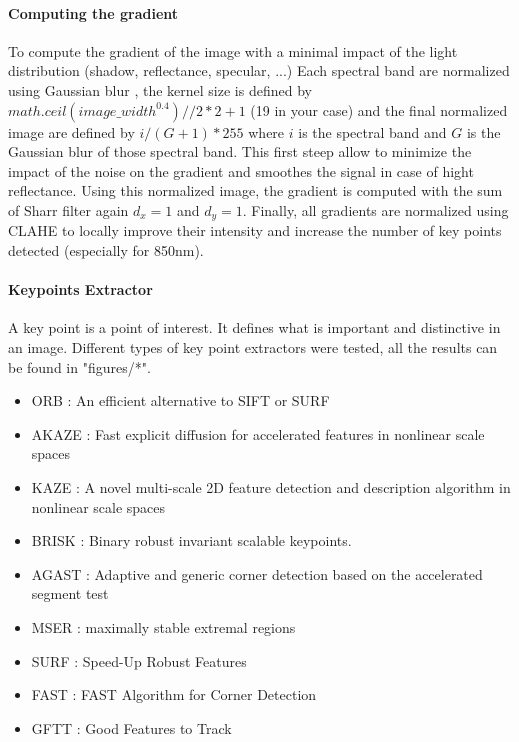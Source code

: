 \documentclass[]{elsarticle}
\begin{document}
	\paragraph{Computing the gradient} To compute the gradient of the image with a minimal impact of the light distribution (shadow, reflectance, specular, ...)
	Each spectral band are normalized using Gaussian blur \cite{sage0303}, the kernel size is defined by $math.ceil(image\_width^{0.4}) // 2 * 2 +1$ (19 in your case)
	and the final normalized image are defined by $i/(G+1)*255$ where $i$ is the spectral band and $G$ is the Gaussian blur of those spectral band.
	This first steep allow to minimize the impact of the noise on the gradient and smoothes the signal in case of hight reflectance.
	Using this normalized image, the gradient is computed with the sum of Sharr filter \cite{Seitz} again $d_x=1$ and $d_y=1$.
	Finally, all gradients are normalized using CLAHE \cite{zuiderveld1994contrast} to locally improve their intensity and increase the number of key points detected (especially for 850nm).
	
	\paragraph{Keypoints Extractor}
	A key point is a point of interest. It defines what is important and distinctive in an image.
	Different types of key point extractors were tested, all the results can be found in "figures/*".
	
	\begin{itemize}
		\item ORB : An efficient alternative to SIFT or SURF
		\item AKAZE : Fast explicit diffusion for accelerated features in nonlinear scale spaces
		\item KAZE : A novel multi-scale 2D feature detection and description algorithm in nonlinear scale spaces \cite{rs10050756}
		\item BRISK : Binary robust invariant scalable keypoints.
		\item AGAST : Adaptive and generic corner detection based on the accelerated segment test
		\item MSER : maximally stable extremal regions
		\item SURF : Speed-Up Robust Features
		\item FAST : FAST Algorithm for Corner Detection
		\item GFTT : Good Features to Track
	\end{itemize}
\end{document}
